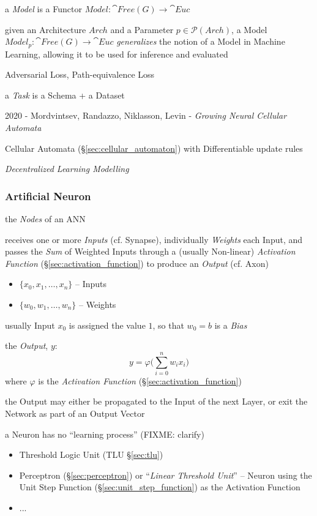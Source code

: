 a \emph{Model} is a Functor $Model : \cat{Free}(G) \to \cat{Euc}$

given an Architecture $Arch$ and a Parameter $p \in \mathcal{P}(Arch)$, a Model
$Model_p : \cat{Free}(G) \to \cat{Euc}$ \emph{generalizes} the notion of
a Model in Machine Learning, allowing it to be used for inference and evaluated

Adversarial Loss, Path-equivalence Loss

a \emph{Task} is a Schema + a Dataset

\asterism

2020 - Mordvintsev, Randazzo, Niklasson, Levin - \emph{Growing Neural Cellular
  Automata}

Cellular Automata (\S\ref{sec:cellular_automaton}) with Differentiable update
rules

\emph{Decentralized Learning Modelling}



\subsubsection{Artificial Neuron}\label{sec:artificial_neuron}

the \emph{Nodes} of an ANN

receives one or more \emph{Inputs} (cf. Synapse), individually \emph{Weights}
each Input, and passes the \emph{Sum} of Weighted Inputs through a (usually
Non-linear) \emph{Activation Function} (\S\ref{sec:activation_function}) to
produce an \emph{Output} (cf. Axon)

\begin{itemize}
  \item $\{ x_0, x_1, \ldots, x_n \}$ -- Inputs
  \item $\{ w_0, w_1, \ldots, w_n \}$ -- Weights
\end{itemize}

usually Input $x_0$ is assigned the value $1$, so that $w_0 = b$ is a
\emph{Bias}

the \emph{Output}, $y$:
\[
  y = \varphi \Big( \sum_{i=0}^n w_i x_i \Big)
\]
where $\varphi$ is the \emph{Activation Function}
(\S\ref{sec:activation_function})

the Output may either be propagated to the Input of the next Layer, or exit the
Network as part of an Output Vector

a Neuron has no ``learning process'' (FIXME: clarify)

\begin{itemize}
  \item Threshold Logic Unit (TLU \S\ref{sec:tlu})
  \item Perceptron (\S\ref{sec:perceptron}) or ``\emph{Linear Threshold Unit}''
    -- Neuron using the Unit Step Function (\S\ref{sec:unit_step_function}) as
    the Activation Function
  \item ...
\end{itemize}



